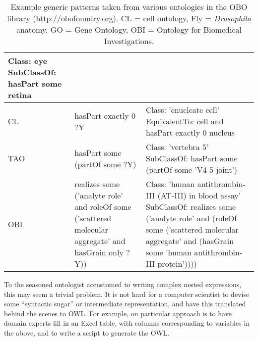 \documentclass{llncs}
\begin{document}
\begin{table}
\begin{tabular}{ | p{1.1cm} | p{4cm} | p{7cm} | }
      Class: eye \newline
      SubClassOf: hasPart some retina 
      \\

      \hline

      CL &

      hasPart exactly 0 ?Y

      &

      Class: 'enucleate cell' \newline
      EquivalentTo: cell and hasPart exactly 0 nucleus

      \\

      \hline

      TAO &

      hasPart some (partOf some ?Y)

      &

      Class: 'vertebra 5' \newline
      SubClassOf: hasPart some (partOf some 'V4-5 joint')

      \\

      \hline

      OBI &

      realizes some ('analyte role' and roleOf some ('scattered molecular aggregate' and hasGrain only ?Y))

      &

      Class: 'human antithrombin-III (AT-III) in blood assay' \newline
      SubClassOf: realizes some ('analyte role' and (roleOf some 
      ('scattered molecular aggregate' and (hasGrain some 'human antithrombin-III protein'))))

      \\



      \hline
    \end{tabular}
    \caption{Example generic patterns taken from various ontologies in
      the OBO library (http://obofoundry.org). CL = cell ontology, Fly
      = \emph{Drosophila} anatomy, GO = Gene Ontology, OBI = Ontology
      for Biomedical Investigations.}
    \label{tab:example-templates}
  \end{table}


To the seasoned ontologist accustomed to writing complex nested
expressions, this may seem a trivial problem. It is not hard for a
computer scientist to devise some ``syntactic sugar'' or intermediate
representation, and have this translated behind the scenes to OWL. For
example, on particular approach is to have domain experts fill in an
Excel table, with columns corresponding to variables in the above, and
to write a script to generate the OWL.
\end{document}
